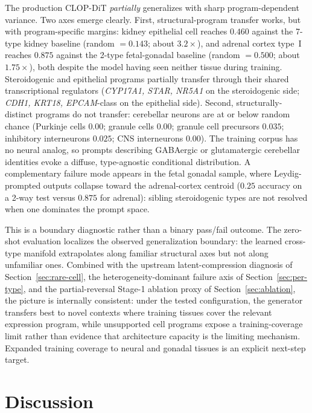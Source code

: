\documentclass[11pt,a4paper]{article}
\begin{document}
The production CLOP-DiT \emph{partially} generalizes with sharp program-dependent variance. Two axes emerge clearly. First, structural-program transfer works, but with program-specific margins: kidney epithelial cell reaches $0.460$ against the 7-type kidney baseline (random $= 0.143$; about $3.2\times$), and adrenal cortex type~I reaches $0.875$ against the 2-type fetal-gonadal baseline (random $= 0.500$; about $1.75\times$), both despite the model having seen neither tissue during training. Steroidogenic and epithelial programs partially transfer through their shared transcriptional regulators (\emph{CYP17A1, STAR, NR5A1} on the steroidogenic side; \emph{CDH1, KRT18, EPCAM}-class on the epithelial side). Second, structurally-distinct programs do not transfer: cerebellar neurons are at or below random chance (Purkinje cells $0.00$; granule cells $0.00$; granule cell precursors $0.035$; inhibitory interneurons $0.025$; CNS interneurons $0.00$). The training corpus has no neural analog, so prompts describing GABAergic or glutamatergic cerebellar identities evoke a diffuse, type-agnostic conditional distribution. A complementary failure mode appears in the fetal gonadal sample, where Leydig-prompted outputs collapse toward the adrenal-cortex centroid ($0.25$ accuracy on a 2-way test versus $0.875$ for adrenal): sibling steroidogenic types are not resolved when one dominates the prompt space.

This is a boundary diagnostic rather than a binary pass/fail outcome. The zero-shot evaluation localizes the observed generalization boundary: the learned cross-type manifold extrapolates along familiar structural axes but not along unfamiliar ones. Combined with the upstream latent-compression diagnosis of Section~\ref{sec:rare-cell}, the heterogeneity-dominant failure axis of Section~\ref{sec:per-type}, and the partial-reversal Stage-1 ablation proxy of Section~\ref{sec:ablation}, the picture is internally consistent: under the tested configuration, the generator transfers best to novel contexts where training tissues cover the relevant expression program, while unsupported cell programs expose a training-coverage limit rather than evidence that architecture capacity is the limiting mechanism. Expanded training coverage to neural and gonadal tissues is an explicit next-step target.

\FloatBarrier
\section{Discussion}\label{sec:discussion}
\end{document}
